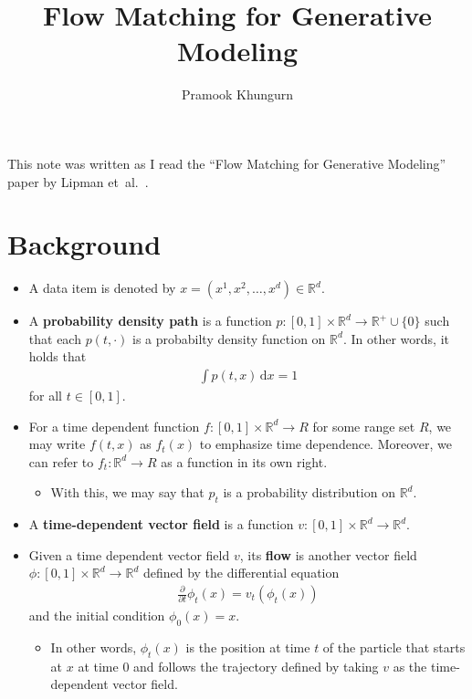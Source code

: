 \documentclass[10pt]{article}
\title{Flow Matching for Generative Modeling}
\author{Pramook Khungurn}
\newcommand{\dee}{\mathrm{d}}
\newcommand{\etal}{{et~al.}}
\newcommand{\Real}{\mathbb{R}}
\begin{document}
\maketitle

This note was written as I read the ``Flow Matching for Generative Modeling'' paper by Lipman \etal~\cite{Lipman:2023}.


\section{Background}

\begin{itemize}
  \item A data item is denoted by $x = (x^1, x^2, \dotsc, x^d) \in \Real^d$.
  
  \item A {\bf probability density path} is a function $p: [0,1] \times \Real^d \rightarrow \Real^{+} \cup \{0\}$ such that each $p(t,\cdot)$ is a probabilty density function on $\Real^d$. In other words, it holds that
  \begin{align*}
    \int p(t,x)\, \dee x = 1
  \end{align*}
  for all $t \in [0,1]$.

  \item For a time dependent function $f: [0,1] \times \Real^d \rightarrow R$ for some range set $R$, we may write $f(t,x)$ as $f_t(x)$ to emphasize time dependence. Moreover, we can refer to $f_t: \Real^d \rightarrow R$ as a function in its own right.
  \begin{itemize}
    \item With this, we may say that $p_t$ is a probability distribution on $\Real^d$. 
  \end{itemize}
  
  \item A {\bf time-dependent vector field} is a function $v: [0,1] \times \Real^d \rightarrow \Real^d$.
  
  \item Given a time dependent vector field $v$, its {\bf flow} is another vector field $\phi: [0,1] \times \Real^d \rightarrow \Real^d$ defined by the differential equation
  \begin{align}
    \frac{\partial}{\partial t} \phi_t(x) = v_t(\phi_t(x)) \label{eqn:flow}
  \end{align}
  and the initial condition $\phi_0(x) = x$.
  \begin{itemize}
    \item In other words, $\phi_t(x)$ is the position at time $t$ of the particle that starts at $x$ at time $0$ and follows the trajectory defined by taking $v$ as the time-dependent vector field.
    

\end{itemize}
\end{itemize}
\end{document}
